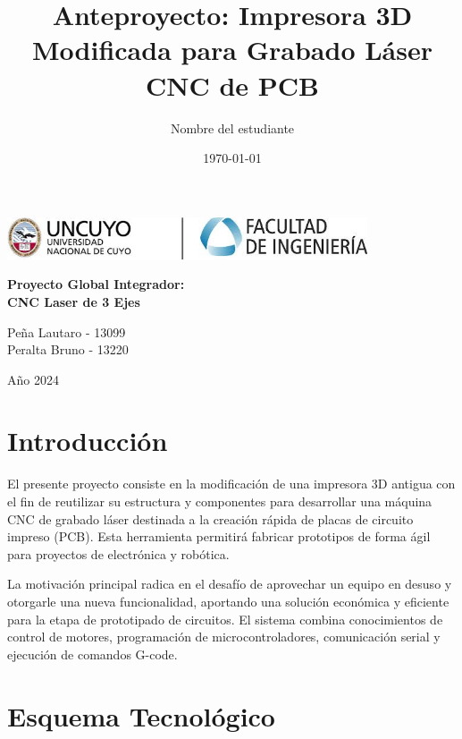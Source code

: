 \documentclass[12pt]{article}
\title{Anteproyecto: Impresora 3D Modificada para Grabado Láser CNC de PCB}
\author{Nombre del estudiante}
\date{\today}
\begin{document}
\begin{titlepage}
    \centering

    \includegraphics[width=0.8\textwidth]{img/fing.jpeg}\par\vspace{1cm}
    \vspace{2cm}
    {\Huge \textbf{Proyecto Global Integrador:}\\[0.5cm]
    \textbf{CNC Laser de 3 Ejes}\vspace{2cm}}
    
    {\Large Peña Lautaro - 13099\\
    Peralta Bruno - 13220\par}\vspace{0.5cm}
    
    {Año 2024\par}
\end{titlepage}


\newpage

\tableofcontents
\newpage


\section{Introducción}

El presente proyecto consiste en la modificación de una impresora 3D antigua con el fin de reutilizar su estructura y componentes para desarrollar una máquina CNC de grabado láser destinada a la creación rápida de placas de circuito impreso (PCB). Esta herramienta permitirá fabricar prototipos de forma ágil para proyectos de electrónica y robótica.

La motivación principal radica en el desafío de aprovechar un equipo en desuso y otorgarle una nueva funcionalidad, aportando una solución económica y eficiente para la etapa de prototipado de circuitos. El sistema combina conocimientos de control de motores, programación de microcontroladores, comunicación serial y ejecución de comandos G-code.

\section{Esquema Tecnológico}
\end{document}
